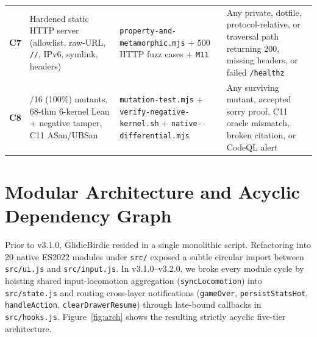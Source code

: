 \documentclass[11pt,letterpaper]{article}
\theoremstyle{remark}
\begin{document}
\begin{table}[ht]
\begin{tabular}{@{} c >{\raggedright\arraybackslash}p{4.2cm} >{\raggedright\arraybackslash}p{4.5cm} >{\raggedright\arraybackslash}p{5.5cm} @{}}
\textbf{C7} & Hardened static HTTP server (allowlist, raw-URL, \texttt{//}, IPv6, symlink, headers) & \texttt{property-and-\allowbreak metamorphic.mjs} + 500 HTTP fuzz cases + \texttt{M11} & Any private, dotfile, protocol-relative, or traversal path returning 200, missing headers, or failed \texttt{/healthz} \\
\textbf{C8} & 16/16 (100\%) mutants, 68-thm 6-kernel Lean + negative tamper, C11 ASan/UBSan & \texttt{mutation-\allowbreak test.mjs} + \texttt{verify-\allowbreak negative-\allowbreak kernel.sh} + \texttt{native-\allowbreak differential.mjs} & Any surviving mutant, accepted sorry proof, C11 oracle mismatch, broken citation, or CodeQL alert \\
\bottomrule
\end{tabular}
\end{table}

\section{Modular Architecture and Acyclic Dependency Graph}
\label{sec:arch}

Prior to v3.1.0, GlidieBirdie resided in a single monolithic script. Refactoring into 20 native ES2022 modules under \texttt{src/} exposed a subtle circular import between \texttt{src/ui.js} and \texttt{src/input.js}. In v3.1.0--v3.2.0, we broke every module cycle by hoisting shared input-locomotion aggregation (\texttt{syncLocomotion}) into \texttt{src/state.js} and routing cross-layer notifications (\texttt{gameOver}, \texttt{persistStatsHot}, \texttt{handleAction}, \texttt{clearDrawerResume}) through late-bound callbacks in \texttt{src/hooks.js}. Figure~\ref{fig:arch} shows the resulting strictly acyclic five-tier architecture.
\end{document}
